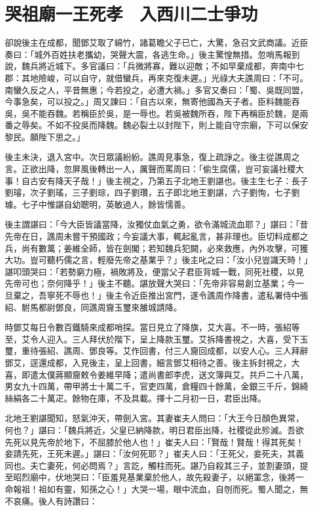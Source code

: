 
\chapter{哭祖廟一王死孝　入西川二士爭功}

卻說後主在成都，聞鄧艾取了綿竹，諸葛瞻父子已亡，大驚，急召文武商議。近臣奏曰：「城外百姓扶老攜幼，哭聲大震，各逃生命。」後主驚惶無措。忽哨馬報到說，魏兵將近城下。多官議曰：「兵微將寡，難以迎敵；不如早棄成都，奔南中七郡：其地險峻，可以自守，就借蠻兵，再來克復未遲。」光祿大夫譙周曰：「不可。南蠻久反之人，平昔無惠；今若投之，必遭大禍。」多官又奏曰：「蜀、吳既同盟，今事急矣，可以投之。」周又諫曰：「自古以來，無寄他國為天子者。臣料魏能吞吳，吳不能吞魏。若稱臣於吳，是一辱也。若吳被魏所吞，陛下再稱臣於魏，是兩番之辱矣。不如不投吳而降魏。魏必裂土以封陛下，則上能自守宗廟，下可以保安黎民。願陛下思之。」

後主未決，退入宮中。次日眾議紛紛。譙周見事急，復上疏諍之。後主從譙周之言。正欲出降，忽屏風後轉出一人，厲聲而罵周曰：「偷生腐儒，豈可妄議社稷大事！自古安有降天子哉！」後主視之，乃第五子北地王劉諶也。後主生七子：長子劉璿，次子劉瑤，三子劉琮，四子劉瓚，五子即北地王劉諶，六子劉恂，七子劉璩。七子中惟諶自幼聰明，英敏過人，餘皆懦善。

後主謂諶曰：「今大臣皆議當降，汝獨仗血氣之勇，欲令滿城流血耶？」諶曰：「昔先帝在日，譙周未嘗干預國政；今妄議大事，輒起亂言，甚非理也。臣切料成都之兵，尚有數萬；姜維全師，皆在劍閣；若知魏兵犯闕，必來救應，內外攻擊，可獲大功。豈可聽朽儒之言，輕廢先帝之基業乎？」後主叱之曰：「汝小兒豈識天時！」諶叩頭哭曰：「若勢窮力極，禍敗將及，便當父子君臣背城一戰，同死社稷，以見先帝可也；奈何降乎！」後主不聽。諶放聲大哭曰：「先帝非容易創立基業；今一旦棄之，吾寧死不辱也！」後主令近臣推出宮門，遂令譙周作降書，遣私署侍中張紹、駙馬都尉鄧良，同譙周齎玉璽來雒城請降。

時鄧艾每日令數百鐵騎來成都哨探。當日見立了降旗，艾大喜。不一時，張紹等至，艾令人迎入。三人拜伏於階下，呈上降款玉璽。艾拆降書視之，大喜，受下玉璽，重待張紹、譙周、鄧良等。艾作回書，付三人齎回成都，以安人心。三人拜辭鄧艾，逕還成都，入見後主，呈上回書，細言鄧艾相待之善。後主拆封視之，大喜，即遣太僕蔣顯齎敕令姜維早降；遣尚書郎李虎，送文簿與艾。共戶二十八萬，男女九十四萬，帶甲將士十萬二千，官吏四萬，倉糧四十餘萬，金銀三千斤，錦綺絲絹各二十萬疋。餘物在庫，不及具載。擇十二月初一日，君臣出降。

北地王劉諶聞知，怒氣沖天，帶劍入宮。其妻崔夫人問曰：「大王今日顏色異常，何也？」諶曰：「魏兵將近，父皇已納降款，明日君臣出降，社稷從此殄滅。吾欲先死以見先帝於地下，不屈膝於他人也！」崔夫人曰：「賢哉！賢哉！得其死矣！妾請先死，王死未遲。」諶曰：「汝何死耶？」崔夫人曰：「王死父，妾死夫，其義同也。夫亡妻死，何必問焉？」言訖，觸柱而死。諶乃自殺其三子，並割妻頭，提至昭烈廟中，伏地哭曰：「臣羞見基業棄於他人，故先殺妻子，以絕罣念，後將一命報祖！祖如有靈，知孫之心！」大哭一場，眼中流血，自刎而死。蜀人聞之，無不哀痛。後人有詩讚曰：

